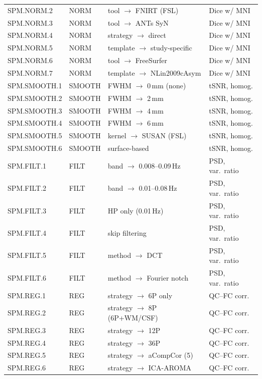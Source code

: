 \documentclass[11pt,a4paper]{article}
\begin{document}
\begin{longtable}{@{}llll@{}}
SPM.NORM.2 & NORM & tool $\to$ FNIRT (FSL)      & Dice w/ MNI \\
SPM.NORM.3 & NORM & tool $\to$ ANTs SyN         & Dice w/ MNI \\
SPM.NORM.4 & NORM & strategy $\to$ direct        & Dice w/ MNI \\
SPM.NORM.5 & NORM & template $\to$ study-specific & Dice w/ MNI \\
SPM.NORM.6 & NORM & tool $\to$ FreeSurfer        & Dice w/ MNI \\
SPM.NORM.7 & NORM & template $\to$ NLin2009cAsym & Dice w/ MNI \\
\midrule
SPM.SMOOTH.1 & SMOOTH & FWHM $\to$ 0\,mm (none)  & tSNR, homog. \\
SPM.SMOOTH.2 & SMOOTH & FWHM $\to$ 2\,mm          & tSNR, homog. \\
SPM.SMOOTH.3 & SMOOTH & FWHM $\to$ 4\,mm          & tSNR, homog. \\
SPM.SMOOTH.4 & SMOOTH & FWHM $\to$ 6\,mm          & tSNR, homog. \\
SPM.SMOOTH.5 & SMOOTH & kernel $\to$ SUSAN (FSL)   & tSNR, homog. \\
SPM.SMOOTH.6 & SMOOTH & surface-based              & tSNR, homog. \\
\midrule
SPM.FILT.1 & FILT & band $\to$ 0.008--0.09\,Hz   & PSD, var.\ ratio \\
SPM.FILT.2 & FILT & band $\to$ 0.01--0.08\,Hz    & PSD, var.\ ratio \\
SPM.FILT.3 & FILT & HP only (0.01\,Hz)            & PSD, var.\ ratio \\
SPM.FILT.4 & FILT & skip filtering                & PSD, var.\ ratio \\
SPM.FILT.5 & FILT & method $\to$ DCT              & PSD, var.\ ratio \\
SPM.FILT.6 & FILT & method $\to$ Fourier notch    & PSD, var.\ ratio \\
\midrule
SPM.REG.1  & REG & strategy $\to$ 6P only        & QC--FC corr. \\
SPM.REG.2  & REG & strategy $\to$ 8P (6P+WM/CSF) & QC--FC corr. \\
SPM.REG.3  & REG & strategy $\to$ 12P            & QC--FC corr. \\
SPM.REG.4  & REG & strategy $\to$ 36P            & QC--FC corr. \\
SPM.REG.5  & REG & strategy $\to$ aCompCor (5)   & QC--FC corr. \\
SPM.REG.6  & REG & strategy $\to$ ICA-AROMA      & QC--FC corr. \\

\end{longtable}
\end{document}
